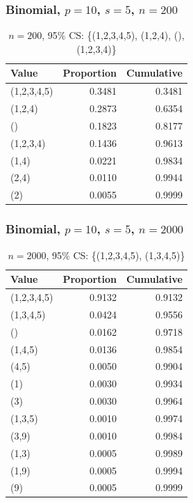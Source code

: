 \documentclass{beamer}
\begin{document}
\begin{frame}
  \frametitle{Binomial, $p=10$, $s=5$, $n=200$}
    \begin{table}[h]
    \footnotesize
    \centering
    \begin{tabular}{l|r|r}
      Value & Proportion & Cumulative \\
      \hline
       (1,2,3,4,5) &    0.3481 & 0.3481\\
     (1,2,4)  &   0.2873 &  0.6354\\
          ()  &   0.1823 & 0.8177\\
   (1,2,3,4) & 0.1436 & 0.9613\\
       (1,4) & 0.0221 & 0.9834\\
       (2,4) & 0.0110 & 0.9944\\
         (2) & 0.0055 & 0.9999
    \end{tabular}
    \caption{{\footnotesize $n=200$, 95\% CS: \{(1,2,3,4,5), (1,2,4), (), (1,2,3,4)\}}}
  \end{table}
\end{frame}

\begin{frame}
  \frametitle{Binomial, $p=10$, $s=5$, $n=2000$}
  \begin{table}[h]
    \footnotesize
    \centering
    \begin{tabular}{l|r|r}
      Value & Proportion & Cumulative \\
      \hline
      (1,2,3,4,5) & 0.9132 & 0.9132 \\
      (1,3,4,5) & 0.0424 & 0.9556 \\
      () & 0.0162 & 0.9718 \\
      (1,4,5) & 0.0136 & 0.9854 \\
      (4,5) & 0.0050 & 0.9904 \\
      (1) & 0.0030 & 0.9934 \\
      (3) & 0.0030 & 0.9964 \\
      (1,3,5) & 0.0010 & 0.9974 \\
      (3,9) & 0.0010 & 0.9984 \\
      (1,3) & 0.0005 & 0.9989 \\
      (1,9) & 0.0005 & 0.9994 \\
      (9) & 0.0005 & 0.9999 \\
    \end{tabular}
    \caption{{\footnotesize $n=2000$, 95\% CS: \{(1,2,3,4,5), (1,3,4,5)\}}}
  \end{table}
\end{frame}
\end{document}
